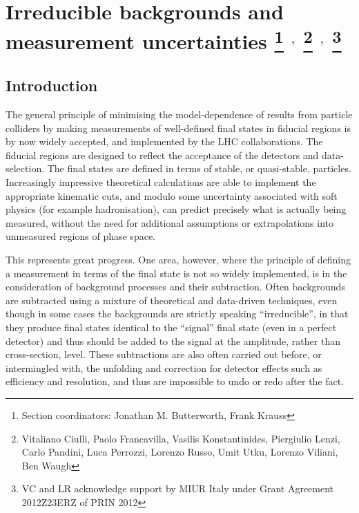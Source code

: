 \documentclass[11pt]{cernrep}
\begin{document}
 
\section{Irreducible backgrounds and measurement uncertainties  \protect\footnote{Section
    coordinators: Jonathan M. Butterworth, Frank Krauss } $^{,}$ \protect\footnote{Vitaliano Ciulli, Paolo
  Francavilla, Vasilis Konstantinides, Piergiulio Lenzi, Carlo Pandini, Luca Perrozzi, Lorenzo Russo, Umit
  Utku, Lorenzo Viliani, Ben Waugh} $^{,}$ \protect\footnote{VC and LR
  acknowledge support by MIUR Italy under Grant Agreement 2012Z23ERZ of PRIN 2012}}



\subsection{Introduction}
\label{sec:intro}

The general principle of minimising the model-dependence of results from particle colliders by making measurements of 
well-defined final states in fiducial regions is by now widely accepted, and implemented by the LHC collaborations. 
The fiducial regions are designed to reflect  the acceptance of the detectors and data-selection. 
The final states are defined in terms of stable, or quasi-stable,
particles. Increasingly impressive theoretical calculations are able to implement the appropriate kinematic cuts, and
modulo some uncertainty associated with soft physics (for example hadronisation), can predict precisely what 
is actually being measured, without the need for additional assumptions or extrapolations into unmeasured regions of 
phase space.

This represents great progress. One area, however, where the principle of defining a measurement in terms of the final state
is not so widely implemented, is in the consideration of background processes and their subtraction. 
Often backgrounds are subtracted using a mixture of theoretical and data-driven techniques, 
even though in some cases the backgrounds are strictly speaking ``irreducible'', in that they produce final states 
identical to the ``signal'' final state (even in a perfect detector) and thus should be added to the signal 
at the amplitude, rather than cross-section, level. These subtractions are also often carried out before, or intermingled with, 
the unfolding and correction for detector effects such as efficiency and resolution, and thus are impossible to
undo or redo after the fact. 
\end{document}
